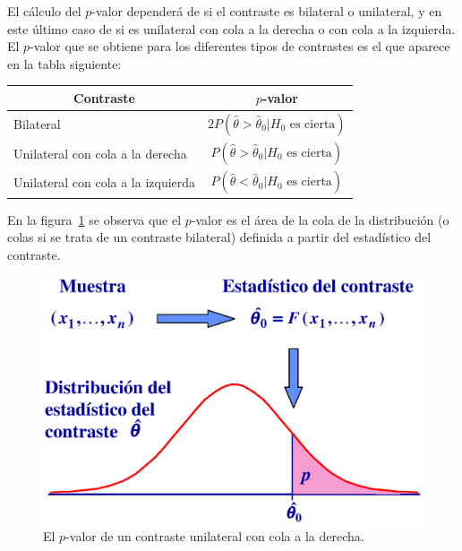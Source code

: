 El cálculo del $p$-valor dependerá de si el contraste es bilateral o unilateral, y en este último caso de si es
unilateral con cola a la derecha o con cola a la izquierda.
El $p$-valor que se obtiene para los diferentes tipos de contrastes es el que aparece en la tabla siguiente:

\begin{center}
\begin{tabular}{|l|l|}
\hline
\multicolumn{1}{|c|}{Contraste} & \multicolumn{1}{c|}{$p$-valor} \\
\hline
\multicolumn{1}{|l|}{Bilateral } & \multicolumn{1}{c|}{$2P( \hat{\theta}  > \hat{\theta} _0 |H_0\textrm{ es cierta})$} \\
\hline
\multicolumn{1}{|l|}{Unilateral con cola a la derecha} & \multicolumn{1}{c|}{$P( \hat\theta  > \hat\theta _0|H_0\textrm{ es cierta})$} \\
\hline
\multicolumn{1}{|l|}{Unilateral con cola a la izquierda} & \multicolumn{1}{c|}{$P( \hat\theta  < \hat\theta _0|H_0\textrm{ es cierta})$} \\
\hline
\end{tabular}
\end{center}

En la figura~\ref{g:pvalor} se observa que el $p$-valor es el área de la cola de la distribución (o colas si se trata de
un contraste bilateral) definida a partir del estadístico del contraste.

\begin{figure}[h!]
\begin{center}
\includegraphics[scale=0.5]{contrastes/img/estadisticocontraste}
\caption{El $p$-valor de un contraste unilateral con cola a la derecha.}
\label{g:pvalor}
\end{center}
\end{figure}


